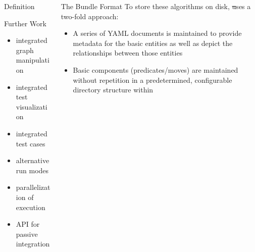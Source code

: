 \documentclass{beamer}
\begin{document}
\begin{frame}[fragile,t]
\begin{columns}[t]
\begin{column}{.45\textwidth}
\begin{block}{Definition}
\begin{center}
        \end{center}
        \vspace{-.03in}
      \end{block}
      \begin{block}{Further Work}
        \begin{multicols}{2}
          \begin{itemize}
          \item integrated graph manipulation
          \item integrated test visualization
          \item integrated test cases
          \item alternative run modes
          \item parallelization of execution
          \item API for passive integration
          \end{itemize}
        \end{multicols}
        \vspace{0.01in}
      \end{block}
    \end{column}
    \begin{column}{.45\textwidth}
      \begin{block}{The Bundle Format}
        To store these algorithms on disk, \st uses a two-fold approach:
        \begin{itemize}
        \item A series of YAML documents is maintained to provide
          metadata for the basic entities as well as depict the
          relationships between those entities
        \item Basic components (predicates\slash moves) are maintained
          without repetition in a predetermined, configurable
          directory structure within 
        \end{itemize}


\end{block}
\end{column}
\end{columns}
\end{frame}
\end{document}
